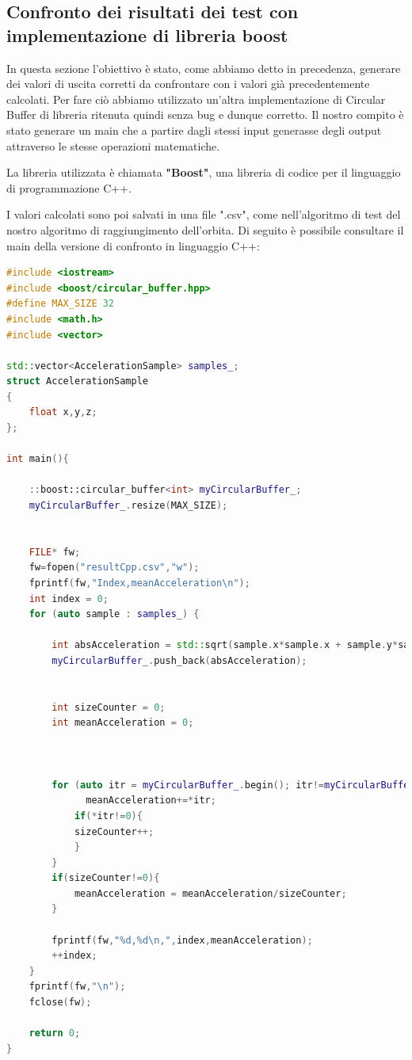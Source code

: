 \documentclass[LaM,binding=0.6cm]{../sapthesis}
\begin{document}
\subsection{Confronto dei risultati dei test con implementazione di libreria boost}

In questa sezione l'obiettivo è stato, come abbiamo detto in precedenza, generare dei valori di uscita corretti da confrontare con i valori già precedentemente calcolati.
Per fare ciò abbiamo utilizzato un'altra implementazione di Circular Buffer di libreria ritenuta quindi senza bug e dunque corretto. Il nostro compito è stato generare un main che a partire dagli stessi input generasse degli output attraverso le stesse operazioni matematiche.

La libreria utilizzata è chiamata \textbf{"Boost"}, una libreria di codice per il linguaggio di programmazione C++.

I valori calcolati sono poi salvati in una file ".csv", come nell'algoritmo di test del nostro algoritmo di raggiungimento dell'orbita.
\newline\newline
Di seguito è possibile consultare il main della versione di confronto in linguaggio C++:
\newline
\begin{lstlisting}[language=C++]
#include <iostream>
#include <boost/circular_buffer.hpp>
#define MAX_SIZE 32
#include <math.h>
#include <vector>

std::vector<AccelerationSample> samples_;
struct AccelerationSample
{
    float x,y,z;  
};

int main(){
    
    ::boost::circular_buffer<int> myCircularBuffer_;
    myCircularBuffer_.resize(MAX_SIZE);
    
    
    FILE* fw;
    fw=fopen("resultCpp.csv","w");
    fprintf(fw,"Index,meanAcceleration\n");
    int index = 0;
    for (auto sample : samples_) {
        
        int absAcceleration = std::sqrt(sample.x*sample.x + sample.y*sample.y + sample.z*sample.z);
        myCircularBuffer_.push_back(absAcceleration); 

        
        int sizeCounter = 0;
        int meanAcceleration = 0;
         
         
        
        for (auto itr = myCircularBuffer_.begin(); itr!=myCircularBuffer_.end() ; ++itr){
              meanAcceleration+=*itr;
            if(*itr!=0){
            sizeCounter++;
            }
        }
        if(sizeCounter!=0){
            meanAcceleration = meanAcceleration/sizeCounter;
        }
        
        fprintf(fw,"%d,%d\n,",index,meanAcceleration);
        ++index;
    }
    fprintf(fw,"\n");
    fclose(fw);
    
    return 0;
}

\end{lstlisting}
\end{document}
